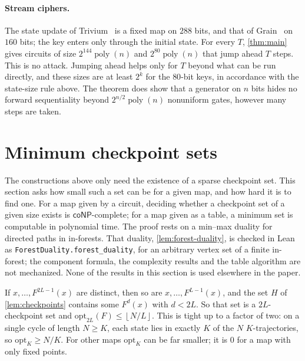 \documentclass[11pt]{article}
\theoremstyle{definition}
\newtheorem{definition}[theorem]{Definition}
\theoremstyle{remark}
\newcommand{\poly}{\operatorname{poly}}
\newcommand{\floor}[1]{\left\lfloor #1\right\rfloor}
\numberwithin{equation}{section}
\begin{document}
\paragraph{Stream ciphers.}
The state update of Trivium~\cite{Trivium06} is a fixed map on $288$ bits,
and that of Grain~\cite{Grain07} on $160$ bits; the key enters only
through the initial state.  For every $T$, \cref{thm:main} gives circuits
of size $2^{144}\poly(n)$ and $2^{80}\poly(n)$ that jump ahead $T$ steps.
This is no attack.  Jumping ahead helps only for $T$ beyond what can be
run directly, and these sizes are at least $2^k$ for the $80$-bit keys,
in accordance with the state-size rule above.  The theorem does show that
a generator on $n$ bits hides no forward sequentiality beyond
$2^{n/2}\poly(n)$ nonuniform gates, however many steps are taken.

\section{Minimum checkpoint sets}\label{sec:min-checkpoints}

The constructions above only need the existence of a sparse checkpoint
set.  This section asks how small such a set can be for a given map, and
how hard it is to find one.  For a map given by a circuit, deciding
whether a checkpoint set of a given size exists is
$\mathsf{coNP}$-complete; for a map given as a table, a minimum set is
computable in polynomial time.  The proof rests on a min--max duality for
directed paths in in-forests.  That duality, \cref{lem:forest-duality},
is checked in Lean as \texttt{ForestDuality.forest\_duality}, for an
arbitrary vertex set of a finite in-forest; the component formula, the
complexity results and the table algorithm are not mechanized.  None of
the results in this section is used elsewhere in the paper.


If $x,\ldots,F^{2L-1}(x)$ are distinct, then so are
$x,\ldots,F^{L-1}(x)$, and the set $H$ of \cref{lem:checkpoints} contains
some $F^d(x)$ with $d<2L$.  So that set is a $2L$-checkpoint set and
$\mathrm{opt}_{2L}(F)\leq\floor{N/L}$.  This is tight up to a factor of
two: on a single cycle of length $N\geq K$, each state lies in exactly
$K$ of the $N$ $K$-trajectories, so $\mathrm{opt}_K\geq N/K$.  For other
maps $\mathrm{opt}_K$ can be far smaller; it is $0$ for a map with only
fixed points.
\end{document}
